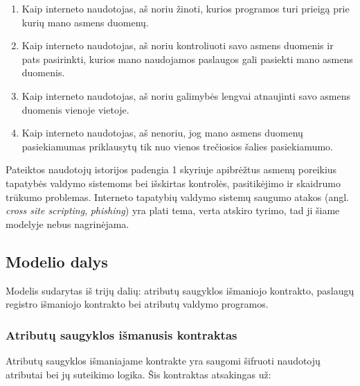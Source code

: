 \begin{enumerate}
    \item Kaip interneto naudotojas, aš noriu žinoti, kurios programos turi prieigą prie kurių mano asmens duomenų.
    \item Kaip interneto naudotojas, aš noriu kontroliuoti savo asmens duomenis ir pats pasirinkti, kurios mano naudojamos paslaugos gali pasiekti mano
    asmens duomenis.
    \item Kaip interneto naudotojas, aš noriu galimybės lengvai atnaujinti savo asmens duomenis vienoje vietoje.
    \item Kaip interneto naudotojas, aš nenoriu, jog mano asmens duomenų pasiekiamumas priklausytų tik nuo vienos trečiosios šalies pasiekiamumo.
\end{enumerate}

Pateiktos naudotojų istorijos padengia 1 skyriuje apibrėžtus asmenų poreikius tapatybės valdymo
sistemoms bei išskirtas kontrolės, pasitikėjimo ir skaidrumo trūkumo problemas. Interneto tapatybių valdymo sistemų saugumo atakos (angl.
\textit{cross site scripting}, \textit{phishing}) yra plati tema, verta atskiro tyrimo, tad ji šiame modelyje nebus nagrinėjama.

\subsection{Modelio dalys}

Modelis sudarytas iš trijų dalių: atributų saugyklos išmaniojo kontrakto, paslaugų registro išmaniojo kontrakto
bei atributų valdymo programos.

\subsubsection{Atributų saugyklos išmanusis kontraktas} \label{BCIDM:blockchainFunctions}

Atributų saugyklos išmaniajame kontrakte yra saugomi šifruoti naudotojų atributai
bei jų suteikimo logika. Šis kontraktas atsakingas už:

